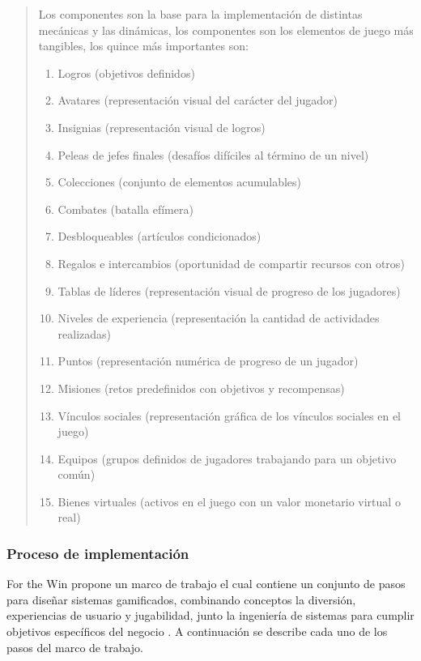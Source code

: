  \begin{quote}
    Los componentes son la base para la implementación de distintas mecánicas y las dinámicas,
    los componentes son los elementos de juego más tangibles, los quince más importantes son:

    \begin{enumerate}
        \item Logros (objetivos definidos)
        \item Avatares (representación visual del carácter del jugador)
        \item Insignias (representación visual de logros)
        \item Peleas de jefes finales (desafíos difíciles al término de un nivel)
        \item Colecciones (conjunto de elementos acumulables)
        \item Combates (batalla efímera)
        \item Desbloqueables (artículos condicionados)
        \item Regalos e intercambios (oportunidad de compartir recursos con otros)
        \item Tablas de líderes (representación visual de progreso de los jugadores)
        \item Niveles de experiencia (representación la cantidad de actividades realizadas)
        \item Puntos (representación numérica de progreso de un jugador)
        \item Misiones (retos predefinidos con objetivos y recompensas)
        \item Vínculos sociales (representación gráfica de los vínculos sociales en el juego)
        \item Equipos (grupos definidos de jugadores trabajando para un objetivo común)
        \item Bienes virtuales (activos en el juego con un valor monetario virtual o real)
    \end{enumerate}
 \end{quote}


\subsubsection{Proceso de implementación}

 For the Win propone un marco de trabajo el cual contiene un conjunto de pasos para diseñar sistemas
 gamificados, combinando conceptos la diversión, experiencias de usuario y jugabilidad, junto la
 ingeniería de sistemas para cumplir objetivos específicos del negocio \cite[p. 70]{ForTheWin}.
 A continuación se describe cada uno de los pasos del marco de trabajo.\\

